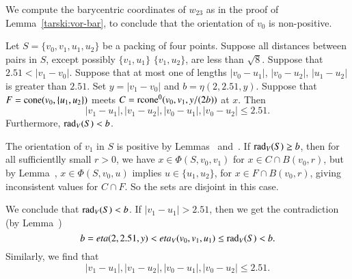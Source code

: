 \begin{tarskidata}
\begin{tarski}
\begin{proved}
We compute the barycentric coordinates of $w_{23}$ as in the proof
of Lemma~\ref{tarski:vor-bar}, to conclude that the orientation
of $v_0$ is non-positive.
\swallowed\end{proved}
\end{tarski}





\begin{tarski}

\begin{lemma}
 Let $S=\{v_0,v_1,u_1,u_2\}$ be a packing of four points.
Suppose all distances between pairs in $S$, except possibly $\{v_1,u_1\}$
$\{v_1,u_2\}$, are
less than $\sqrt8$. Suppose that $2.51 < |v_1-v_0|$.
Suppose that at most one of lengths $|v_0-u_1|$,
$|v_0-u_2|$, $|u_1-u_2|$ is greater than $2.51$.
%
Set $y=|v_1-v_0|$ and $b=\eta(2,2.51,y)$.
Suppose that $F={\operatorname{cone}}(v_0,\{u_1,u_2\})$ meets
$C={\operatorname{rcone}}^0(v_0,v_1,y/(2b))$ at $x$.
Then 
  $$
  |v_1-u_1|,|v_1-u_2|,|v_0-u_1|,|v_0-u_2|\le 2.51.
  $$
Furthermore, $\operatorname{rad}_V(S) < b$. 
\end{lemma}

\begin{proved}  
The orientation
of $v_1$ in $S$ is positive by Lemmas~ and~.
 If $\operatorname{rad}_V(S)\ge b$, then for all sufficientlly small $r>0$, we have
$x\in\Phi(S,v_0,v_1)$ for $x\in C\cap B(v_0,r)$, 
but by Lemma~, $x\in\Phi(S,v_0,u)$ implies $u\in\{u_1,u_2\}$,
for $x\in F\cap B(v_0,r)$, giving inconsistent values for $C\cap F$.  So
the sets are disjoint in this case.  

We conclude that $\operatorname{rad}_V(S) < b$.
If $|v_1-u_1| > 2.51$, then we get the contradiction (by Lemma~)
$$b = eta(2,2.51,y) < eta_V(v_0,v_1,u_1)\le \operatorname{rad}_V(S) < b.$$
Similarly, we find that
   $$
   |v_1-u_1|,|v_1-u_2|,|v_0-u_1|,|v_0-u_2| \le 2.51.
   $$
\swallowed\end{proved}
\end{tarski}






\end{tarskidata}
